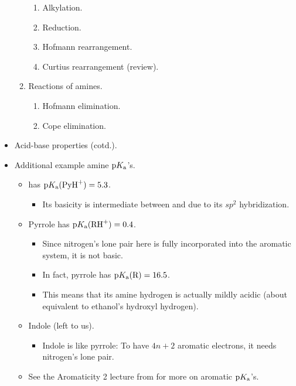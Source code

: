 \documentclass[../notes.tex]{subfiles}
\begin{document}
\begin{itemize}
\begin{enumerate}[label={\Roman*.}]
        \begin{enumerate}[label={\Alph*.}]
            \item Alkylation.
            \item Reduction.
            \item Hofmann rearrangement.
            \item Curtius rearrangement (review).
        \end{enumerate}
        \item Reactions of amines.
        \begin{enumerate}[label={\Alph*.}]
            \item Hofmann elimination.
            \item Cope elimination.
        \end{enumerate}
    \end{enumerate}
    \item Acid-base properties (cotd.).
    \item Additional example amine $\text{p}K_\text{a}$'s.
    \begin{itemize}
        \item {} has $\pKa(\ce{PyH+})=5.3$.
        \begin{itemize}
            \item Its basicity is intermediate between  and  due to its $sp^2$ hybridization.
        \end{itemize}
        \item Pyrrole has $\pKa(\ce{RH+})=0.4$.
        \begin{itemize}
            \item Since nitrogen's lone pair here is fully incorporated into the aromatic system, it is not basic.
            \item In fact, pyrrole has $\pKa(\ce{R})=16.5$.
            \item This means that its amine hydrogen is actually mildly acidic (about equivalent to ethanol's hydroxyl hydrogen).
        \end{itemize}
        \item Indole (left to us).
        \begin{itemize}
            \item Indole is like pyrrole: To have $4n+2$ aromatic electrons, it needs nitrogen's lone pair.
        \end{itemize}
        \item See the Aromaticity 2 lecture from \textcite{bib:CHEM22100Notes} for more on aromatic $\text{p}K_\text{a}$'s.

\end{itemize}
\end{itemize}
\end{document}

